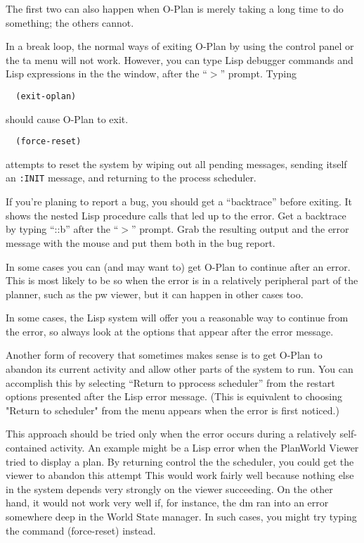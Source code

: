 The first two can also happen when O-Plan is merely taking a long
time to do something; the others cannot.

In a break loop, the normal ways of exiting O-Plan by using the
control panel or the {\sc ta} menu will not work.  However, you can
type Lisp debugger commands and Lisp expressions in the the window,
after the ``$>$'' prompt.  Typing

\begin{verbatim}
  (exit-oplan)
\end{verbatim}

should cause O-Plan to exit.

\begin{verbatim}
  (force-reset)
\end{verbatim}

attempts to reset the system by wiping out all pending messages,
sending itself an {\tt :INIT} message, and returning to the process
scheduler.

If you're planing to report a bug, you should get a ``backtrace''
before exiting.  It shows the nested Lisp procedure calls that led up
to the error.  Get a backtrace by typing ``::b'' after the ``$>$''
prompt.  Grab the resulting output and the error message with the
mouse and put them both in the bug report.

In some cases you can (and may want to) get O-Plan to continue after
an error.  This is most likely to be so when the error is in a
relatively peripheral part of the planner, such as the {\sc pw}
viewer, but it can happen in other cases too.

In some cases, the Lisp system will offer you a reasonable way to
continue from the error, so always look at the options that appear
after the error message.

Another form of recovery that sometimes makes sense is to get O-Plan
to abandon its current activity and allow other parts of the system to
run.  You can accomplish this by selecting ``Return to pprocess
scheduler'' from the restart options presented after the Lisp error
message.  (This is equivalent to choosing "Return to scheduler" from
the menu appears when the error is first noticed.)

This approach should be tried only when the error occurs during a
relatively self-contained activity.  An example might be a Lisp error
when the PlanWorld Viewer tried to display a plan.  By returning
control the the scheduler, you could get the viewer to abandon this
attempt This would work fairly well because nothing else in the system
depends very strongly on the viewer succeeding.  On the other hand, it
would not work very well if, for instance, the {\sc dm} ran into an
error somewhere deep in the World State manager.  In such cases, you
might try typing the command (force-reset) instead.


